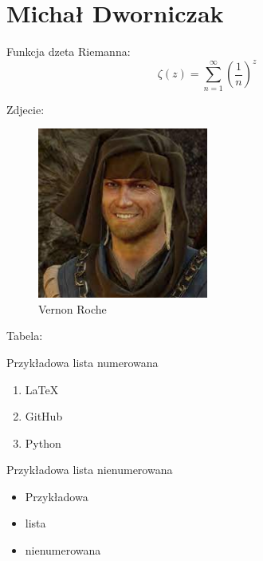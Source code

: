 \section{Michał Dworniczak}

Funkcja dzeta Riemanna: $$\zeta(z) = \sum_{n = 1}^{\infty}\left(\frac{1}{n}\right)^z$$


Zdjecie:

\begin{figure}[htbp]
    \centering
    \includegraphics[width=0.5\textwidth]{pictures/vernonroche.jpg}
    \caption{Vernon Roche}
    \label{fig:vernon}
\end{figure}

Tabela:



\vspace{2cm}

Przykładowa lista numerowana

\begin{enumerate}
    \item \LaTeX
    \item GitHub
    \item Python
\end{enumerate}

\vspace{0.5cm}

Przykładowa lista nienumerowana

\begin{itemize}
    \item Przykładowa
    \item lista
    \item nienumerowana
\end{itemize}

\vspace{0.5cm}

